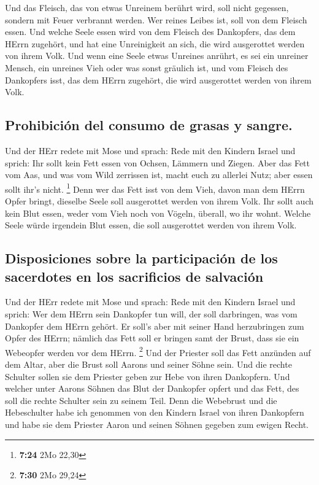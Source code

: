  Und das Fleisch, das von etwas Unreinem berührt wird,
soll nicht gegessen, sondern mit Feuer verbrannt werden. Wer reines
Leibes ist, soll von dem Fleisch essen.  Und welche Seele
essen wird von dem Fleisch des Dankopfers, das dem HErrn zugehört, und
hat eine Unreinigkeit an sich, die wird ausgerottet werden von ihrem
Volk.  Und wenn eine Seele etwas Unreines anrührt, es sei
ein unreiner Mensch, ein unreines Vieh oder was sonst gräulich ist, und
vom Fleisch des Dankopfers isst, das dem HErrn zugehört, die wird
ausgerottet werden von ihrem Volk.

\hypertarget{prohibiciuxf3n-del-consumo-de-grasas-y-sangre.}{%
\subsection{Prohibición del consumo de grasas y
sangre.}\label{prohibiciuxf3n-del-consumo-de-grasas-y-sangre.}}

 Und der HErr redete mit Mose und sprach: 
Rede mit den Kindern Israel und sprich: Ihr sollt kein Fett essen von
Ochsen, Lämmern und Ziegen.  Aber das Fett vom Aas, und
was vom Wild zerrissen ist, macht euch zu allerlei Nutz; aber essen
sollt ihr's nicht. \footnote{\textbf{7:24} 2Mo 22,30} 
Denn wer das Fett isst von dem Vieh, davon man dem HErrn Opfer bringt,
dieselbe Seele soll ausgerottet werden von ihrem Volk. 
Ihr sollt auch kein Blut essen, weder vom Vieh noch von Vögeln, überall,
wo ihr wohnt.  Welche Seele würde irgendein Blut essen,
die soll ausgerottet werden von ihrem Volk.

\hypertarget{disposiciones-sobre-la-participaciuxf3n-de-los-sacerdotes-en-los-sacrificios-de-salvaciuxf3n}{%
\subsection{Disposiciones sobre la participación de los sacerdotes en
los sacrificios de
salvación}\label{disposiciones-sobre-la-participaciuxf3n-de-los-sacerdotes-en-los-sacrificios-de-salvaciuxf3n}}

 Und der HErr redete mit Mose und sprach: 
Rede mit den Kindern Israel und sprich: Wer dem HErrn sein Dankopfer tun
will, der soll darbringen, was vom Dankopfer dem HErrn gehört.
 Er soll's aber mit seiner Hand herzubringen zum Opfer
des HErrn; nämlich das Fett soll er bringen samt der Brust, dass sie ein
Webeopfer werden vor dem HErrn. \footnote{\textbf{7:30} 2Mo 29,24}
 Und der Priester soll das Fett anzünden auf dem Altar,
aber die Brust soll Aarons und seiner Söhne sein.  Und
die rechte Schulter sollen sie dem Priester geben zur Hebe von ihren
Dankopfern.  Und welcher unter Aarons Söhnen das Blut der
Dankopfer opfert und das Fett, des soll die rechte Schulter sein zu
seinem Teil.  Denn die Webebrust und die Hebeschulter
habe ich genommen von den Kindern Israel von ihren Dankopfern und habe
sie dem Priester Aaron und seinen Söhnen gegeben zum ewigen Recht.

